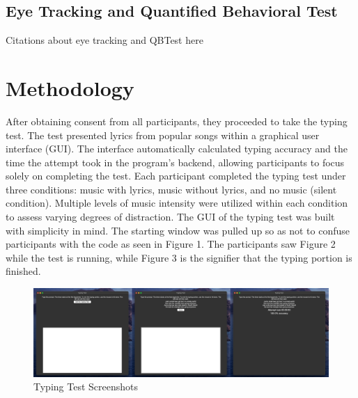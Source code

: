 \documentclass[manuscript, screen, review]{acmart} %
\begin{document}
\subsection{Eye Tracking and Quantified Behavioral Test}
Citations about eye tracking and QBTest here

\section{Methodology}
After obtaining consent from all participants, they proceeded to take the typing test. The test presented lyrics from popular songs within a graphical user interface (GUI). 
The interface automatically calculated typing accuracy and the time the attempt took in the program's backend, allowing participants to focus solely on completing the test.
Each participant completed the typing test under three conditions: music with lyrics, music without lyrics, and no music (silent condition).
Multiple levels of music intensity were utilized within each condition to assess varying degrees of distraction.
The GUI of the typing test was built with simplicity in mind. The starting window was pulled up so as not to confuse participants with the code as seen in Figure 1. The participants saw Figure 2 while the test is running, while Figure 3 is the signifier that the typing portion is finished. 




\begin{figure}
  \includegraphics[width=\textwidth]{typingTest}
  \caption{Typing Test Screenshots}
\end{figure}
\end{document}
